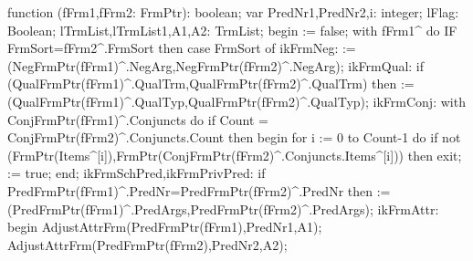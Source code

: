 \nwendcode{}\nwdocspar
\nwenddocs{}\endmoddef\nwstartdeflinemarkup\nwenddeflinemarkup
function (fFrm1,fFrm2: FrmPtr): boolean;
var
   PredNr1,PredNr2,i: integer;
   lFlag: Boolean;
   lTrmList,lTrmList1,A1,A2: TrmList;
begin
    := false;
   with fFrm1^ do IF FrmSort=fFrm2^.FrmSort then
      case FrmSort of
         ikFrmNeg:
             := (NegFrmPtr(fFrm1)^.NegArg,NegFrmPtr(fFrm2)^.NegArg);
         ikFrmQual:
            if (QualFrmPtr(fFrm1)^.QualTrm,QualFrmPtr(fFrm2)^.QualTrm) then
                := (QualFrmPtr(fFrm1)^.QualTyp,QualFrmPtr(fFrm2)^.QualTyp);
         ikFrmConj:
            with ConjFrmPtr(fFrm1)^.Conjuncts do
            if Count = ConjFrmPtr(fFrm2)^.Conjuncts.Count then
            begin
               for i := 0 to Count-1 do
                  if not (FrmPtr(Items^[i]),FrmPtr(ConjFrmPtr(fFrm2)^.Conjuncts.Items^[i])) then
                     exit;
                := true;
            end;
         ikFrmSchPred,ikFrmPrivPred:
            if PredFrmPtr(fFrm1)^.PredNr=PredFrmPtr(fFrm2)^.PredNr then
                := (PredFrmPtr(fFrm1)^.PredArgs,PredFrmPtr(fFrm2)^.PredArgs);
         ikFrmAttr:
            begin
               AdjustAttrFrm(PredFrmPtr(fFrm1),PredNr1,A1);
               AdjustAttrFrm(PredFrmPtr(fFrm2),PredNr2,A2);

